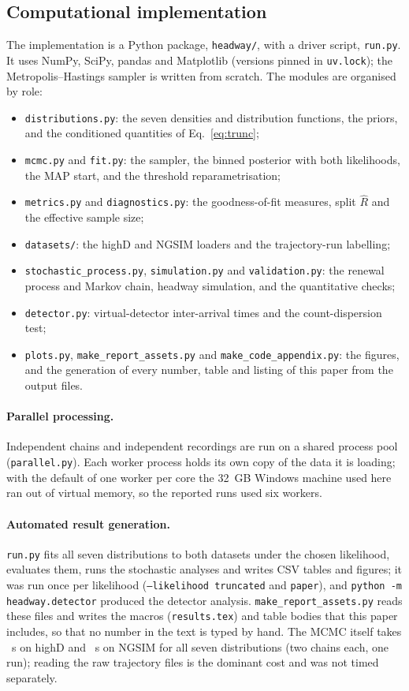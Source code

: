\documentclass[11pt,a4paper]{article}
\numberwithin{equation}{section}
\begin{document}
\subsection{Computational implementation}\label{sec:impl}
The implementation is a Python package, \texttt{headway/}, with a driver script, \texttt{run.py}. It uses NumPy, SciPy, pandas and Matplotlib (versions pinned in \texttt{uv.lock}); the
Metropolis--Hastings sampler is written from scratch. The modules are organised by role:
\begin{itemize}
  \item \texttt{distributions.py}: the seven densities and distribution functions, the priors, and the conditioned quantities of Eq.~\eqref{eq:trunc};
  \item \texttt{mcmc.py} and \texttt{fit.py}: the sampler, the binned posterior with both likelihoods, the MAP start, and the threshold reparametrisation;
  \item \texttt{metrics.py} and \texttt{diagnostics.py}: the goodness-of-fit measures, split $\hat R$ and the effective sample size;
  \item \texttt{datasets/}: the highD and NGSIM loaders and the trajectory-run labelling;
  \item \texttt{stochastic\_process.py}, \texttt{simulation.py} and \texttt{validation.py}: the renewal process and Markov chain, headway simulation, and the quantitative checks;
  \item \texttt{detector.py}: virtual-detector inter-arrival times and the count-dispersion test;
  \item \texttt{plots.py}, \texttt{make\_report\_assets.py} and \texttt{make\_code\_appendix.py}: the figures, and the generation of every number, table and listing of this paper from the output files.
\end{itemize}
\paragraph{Parallel processing.} Independent chains and independent recordings are run on a shared process pool (\texttt{parallel.py}). Each worker process holds its own copy of the data it is loading; with the default of one worker per core the 32~GB Windows machine used here ran out of virtual memory,
so the reported runs used six workers. \paragraph{Automated result generation.} \texttt{run.py} fits all seven distributions to both datasets under the chosen likelihood, evaluates them, runs the stochastic analyses and writes CSV tables and figures; it was run once per likelihood (\texttt{--likelihood truncated} and \texttt{paper}), and
\texttt{python -m headway.detector} produced the detector analysis. \texttt{make\_report\_assets.py} reads these files and writes the macros (\texttt{results.tex}) and table bodies that this paper includes, so that no number in the text is typed by hand. The MCMC itself takes \hdMcmcTime~s on highD and \ngMcmcTime~s on NGSIM
for all seven distributions (two chains each, one run); reading the raw trajectory files is the dominant cost and was not timed separately.
\end{document}
